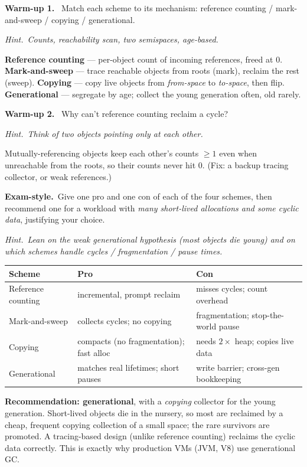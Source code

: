\documentclass[11pt,a4paper]{article}
\newcommand{\hint}[1]{\par{\small\textcolor{accent}{\textit{Hint.}}\ \textit{#1}}\par\smallskip}
\newcommand{\warm}[1]{\smallskip\textbf{\textcolor{hi}{Warm-up #1.}}\ }
\newcommand{\exam}{\smallskip\textbf{\textcolor{warn}{Exam-style.}}\ }
\begin{document}
\warm{1} Match each scheme to its mechanism: reference counting / mark-and-sweep / copying / generational.
\hint{Counts, reachability scan, two semispaces, age-based.}
\begin{sol}
\textbf{Reference counting} --- per-object count of incoming references, freed at 0. \textbf{Mark-and-sweep} --- trace reachable objects from roots (mark), reclaim the rest (sweep). \textbf{Copying} --- copy live objects from \emph{from-space} to \emph{to-space}, then flip. \textbf{Generational} --- segregate by age; collect the young generation often, old rarely.
\end{sol}

\warm{2} Why can't reference counting reclaim a cycle?
\hint{Think of two objects pointing only at each other.}
\begin{sol}
Mutually-referencing objects keep each other's counts $\ge1$ even when unreachable from the roots, so their counts never hit 0. (Fix: a backup tracing collector, or weak references.)
\end{sol}

\exam Give one pro and one con of each of the four schemes, then recommend one for a workload with \emph{many short-lived allocations and some cyclic data}, justifying your choice.
\hint{Lean on the weak generational hypothesis (most objects die young) and on which schemes handle cycles / fragmentation / pause times.}
\begin{sol}
\begin{center}\small
\begin{tabular}{lll}
Scheme & Pro & Con\\\hline
Reference counting & incremental, prompt reclaim & misses cycles; count overhead\\
Mark-and-sweep & collects cycles; no copying & fragmentation; stop-the-world pause\\
Copying & compacts (no fragmentation); fast alloc & needs $2\times$ heap; copies live data\\
Generational & matches real lifetimes; short pauses & write barrier; cross-gen bookkeeping\\
\end{tabular}
\end{center}
\textbf{Recommendation: generational}, with a \emph{copying} collector for the young generation. Short-lived objects die in the nursery, so most are reclaimed by a cheap, frequent copying collection of a small space; the rare survivors are promoted. A tracing-based design (unlike reference counting) reclaims the cyclic data correctly. This is exactly why production VMs (JVM, V8) use generational GC.
\end{sol}
\end{document}
